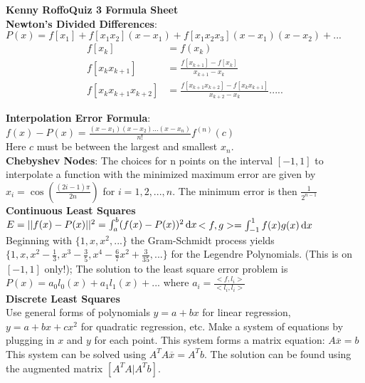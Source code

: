 \documentclass{scrartcl}
\begin{document}
\textbf{Kenny Roffo\hfill Quiz 3 Formula Sheet}\\

\textbf{Newton's Divided Differences}:\\ $P(x)=f[x_1]+f[x_1 x_2](x-x_1)+f[x_1 x_2 x_3](x-x_1)(x-x_2)+...$
\begin{align*}
f[x_k]&=f(x_k)\\
f[x_k x_{k+1}]&=\frac{f[x_{k+1}]-f[x_k]}{x_{k+1}-x_k}\\
f[x_k x_{k+1} x_{k+2}]&=\frac{f[x_{k+1} x_{k+2}]-f[x_k x_{k+1}]}{x_{k+2}-x_k}.....
\end{align*}

\textbf{Interpolation Error Formula}: $f(x)-P(x)=\frac{(x-x_1)(x-x_2)...(x-x_{n})}{n!}f^{(n)}(c)$\\
Here $c$ must be between the largest and smallest $x_n$.\\

\textbf{Chebyshev Nodes}: The choices for n points on the interval $[-1,1]$ to interpolate a function with the minimized maximum error are given by $x_i=\cos\left(\frac{(2i-1)\pi}{2n}\right)$ for $i=1,2,...,n$. The minimum error is then $\frac{1}{2^{n-1}}$\\

\textbf{Continuous Least Squares}\\
$E=||f(x)-P(x)||^2=\int_a^b(f(x)-P(x))^2\dif{x}$\hspace{0.8in}$<f,g>=\int_{-1}^1f(x)g(x)\dif{x}$\\
Beginning with $\{1,x,x^2,...\}$ the Gram-Schmidt process yields $\{1,x,x^2-\frac{1}{3},x^3-\frac{3}{5},x^4-\frac{6}{7}x^2+\frac{3}{35},...\}$ for the Legendre Polynomials. (This is on $[-1,1]$ only!); The solution to the least square error problem is $P(x)=a_0l_0(x)+a_1l_1(x)+...$ where $a_i=\frac{<f,l_i>}{<l_i,l_i>}$\\

\textbf{Discrete Least Squares}\\
Use general forms of polynomials $y=a+bx$ for linear regression, $y=a+bx+cx^2$ for quadratic regression, etc. Make a system of equations by plugging in $x$ and $y$ for each point. This system forms a matrix equation: $A\overline{x}=b$ This system can be solved using $A^TA\overline{x}=A^Tb$. The solution can be found using the augmented matrix $[A^TA|A^Tb]$.
\end{document}
